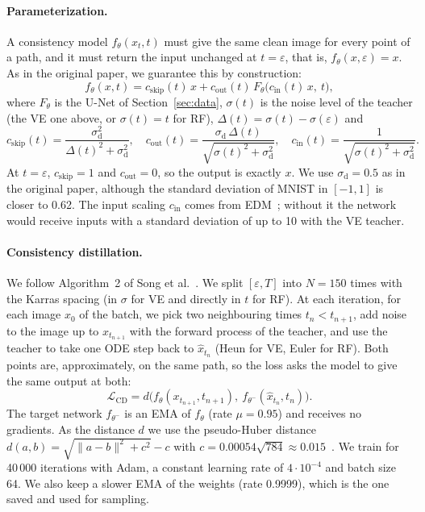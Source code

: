 \documentclass{article}
\begin{document}
\paragraph{Parameterization.} A consistency model $f_\theta(x_t, t)$ must give
the same clean image for every point of a path, and it must return the input
unchanged at $t = \varepsilon$, that is, $f_\theta(x, \varepsilon) = x$. As in
the original paper, we guarantee this by construction:
\begin{equation}
  f_\theta(x, t) = c_\text{skip}(t)\, x + c_\text{out}(t)\, F_\theta\big(c_\text{in}(t)\, x,\ t\big),
\end{equation}
where $F_\theta$ is the U-Net of Section~\ref{sec:data}, $\sigma(t)$ is the
noise level of the teacher (the VE one above, or $\sigma(t) = t$ for RF),
$\Delta(t) = \sigma(t) - \sigma(\varepsilon)$ and
\begin{equation}
  c_\text{skip}(t) = \frac{\sigma_\text{d}^2}{\Delta(t)^2 + \sigma_\text{d}^2}, \quad
  c_\text{out}(t) = \frac{\sigma_\text{d}\,\Delta(t)}{\sqrt{\sigma(t)^2 + \sigma_\text{d}^2}}, \quad
  c_\text{in}(t) = \frac{1}{\sqrt{\sigma(t)^2 + \sigma_\text{d}^2}}.
\end{equation}
At $t = \varepsilon$, $c_\text{skip} = 1$ and $c_\text{out} = 0$, so the output
is exactly $x$. We use $\sigma_\text{d} = 0.5$ as in the original paper,
although the standard deviation of MNIST in $[-1, 1]$ is closer to 0.62. The
input scaling $c_\text{in}$ comes from EDM~\cite{karras2022edm}; without it the
network would receive inputs with a standard deviation of up to 10 with the VE
teacher.

\paragraph{Consistency distillation.} We follow Algorithm~2 of Song et
al.~\cite{song2023consistency}. We split $[\varepsilon, T]$ into $N = 150$ times
with the Karras spacing (in $\sigma$ for VE and directly in $t$ for RF). At each
iteration, for each image $x_0$ of the batch, we pick two neighbouring times
$t_n < t_{n+1}$, add noise to the image up to $x_{t_{n+1}}$ with the forward
process of the teacher, and use the teacher to take one ODE step back to
$\hat{x}_{t_n}$ (Heun for VE, Euler for RF). Both points are, approximately, on
the same path, so the loss asks the model to give the same output at both:
\begin{equation}
  \mathcal{L}_\text{CD} = d\big(f_\theta(x_{t_{n+1}}, t_{n+1}),\ f_{\theta^-}(\hat{x}_{t_n}, t_n)\big).
\end{equation}
The target network $f_{\theta^-}$ is an EMA of $f_\theta$ (rate $\mu = 0.95$)
and receives no gradients. As the distance $d$ we use the pseudo-Huber distance
$d(a, b) = \sqrt{\|a - b\|^2 + c^2} - c$ with
$c = 0.00054\sqrt{784} \approx 0.015$~\cite{song2024improved}. We train for
40\,000 iterations with Adam, a constant learning rate of $4\cdot10^{-4}$ and
batch size 64. We also keep a slower EMA of the weights (rate 0.9999), which is
the one saved and used for sampling.
\end{document}
